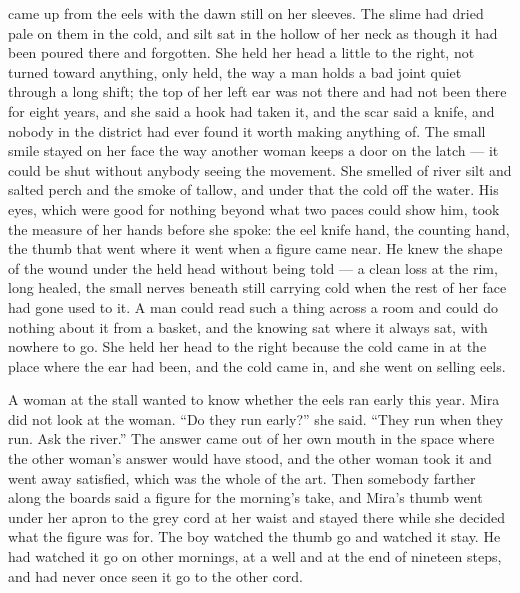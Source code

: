  came up from the eels with the dawn still on her sleeves. The slime had dried pale on them in the cold, and silt sat in the hollow of her neck as though it had been poured there and forgotten. She held her head a little to the right, not turned toward anything, only held, the way a man holds a bad joint quiet through a long shift; the top of her left ear was not there and had not been there for eight years, and she said a hook had taken it, and the scar said a knife, and nobody in the district had ever found it worth making anything of. The small smile stayed on her face the way another woman keeps a door on the latch --- it could be shut without anybody seeing the movement. She smelled of river silt and salted perch and the smoke of tallow, and under that the cold off the water. His eyes, which were good for nothing beyond what two paces could show him, took the measure of her hands before she spoke: the eel knife hand, the counting hand, the thumb that went where it went when a figure came near. He knew the shape of the wound under the held head without being told --- a clean loss at the rim, long healed, the small nerves beneath still carrying cold when the rest of her face had gone used to it. A man could read such a thing across a room and could do nothing about it from a basket, and the knowing sat where it always sat, with nowhere to go. She held her head to the right because the cold came in at the place where the ear had been, and the cold came in, and she went on selling eels.

A woman at the stall wanted to know whether the eels ran early this year. Mira did not look at the woman. “Do they run early?” she said. “They run when they run. Ask the river.” The answer came out of her own mouth in the space where the other woman's answer would have stood, and the other woman took it and went away satisfied, which was the whole of the art. Then somebody farther along the boards said a figure for the morning's take, and Mira's thumb went under her apron to the grey cord at her waist and stayed there while she decided what the figure was for. The boy watched the thumb go and watched it stay. He had watched it go on other mornings, at a well and at the end of nineteen steps, and had never once seen it go to the other cord.

